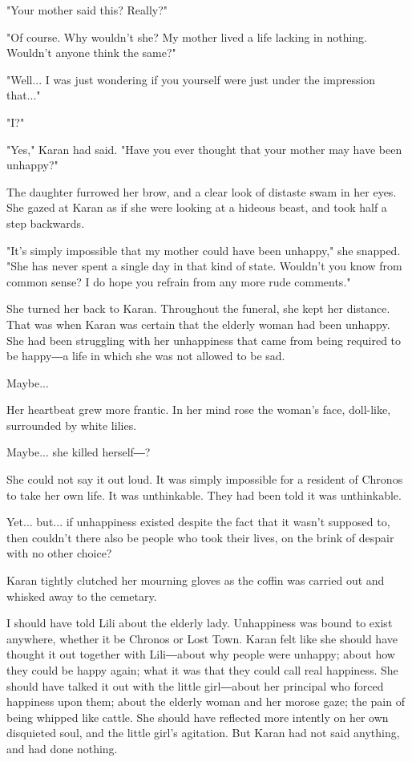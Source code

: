 "Your mother said this? Really?"

"Of course. Why wouldn't she? My mother lived a life lacking in nothing.
Wouldn't anyone think the same?"

"Well... I was just wondering if you yourself were just under the
impression that..."

"I?"

"Yes," Karan had said. "Have you ever thought that your mother may have
been unhappy?"

The daughter furrowed her brow, and a clear look of distaste swam in her
eyes. She gazed at Karan as if she were looking at a hideous beast, and
took half a step backwards.

"It's simply impossible that my mother could have been unhappy," she
snapped. "She has never spent a single day in that kind of state.
Wouldn't you know from common sense? I do hope you refrain from any more
rude comments."

She turned her back to Karan. Throughout the funeral, she kept her
distance. That was when Karan was certain that the elderly woman had
been unhappy. She had been struggling with her unhappiness that came
from being required to be happy―a life in which she was not allowed to
be sad.

Maybe...

Her heartbeat grew more frantic. In her mind rose the woman's face,
doll-like, surrounded by white lilies.

Maybe... she killed herself―?

She could not say it out loud. It was simply impossible for a resident
of Chronos to take her own life. It was unthinkable. They had been told
it was unthinkable.

Yet... but... if unhappiness existed despite the fact that it wasn't
supposed to, then couldn't there also be people who took their lives, on
the brink of despair with no other choice?

Karan tightly clutched her mourning gloves as the coffin was carried out
and whisked away to the cemetary.

I should have told Lili about the elderly lady. Unhappiness was bound to
exist anywhere, whether it be Chronos or Lost Town. Karan felt like she
should have thought it out together with Lili―about why people were
unhappy; about how they could be happy again; what it was that they
could call real happiness. She should have talked it out with the little
girl―about her principal who forced happiness upon them; about the
elderly woman and her morose gaze; the pain of being whipped like
cattle. She should have reflected more intently on her own disquieted
soul, and the little girl's agitation. But Karan had not said anything,
and had done nothing.

